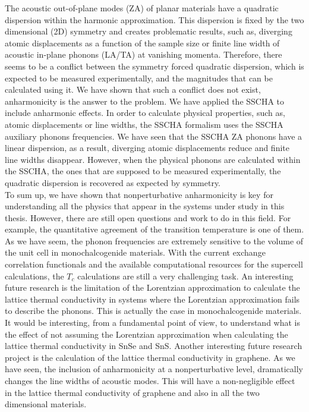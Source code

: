 The acoustic out-of-plane modes (ZA) of planar materials have a quadratic dispersion within the harmonic 
approximation. This dispersion is fixed by the two dimensional (2D) symmetry and creates problematic 
results, such as, diverging atomic displacements as a function of the sample size or finite line width of acoustic 
in-plane phonons (LA/TA) at vanishing momenta. Therefore, there seems to be a conflict between the symmetry forced 
quadratic dispersion, which is expected to be measured experimentally, and the magnitudes that can be calculated 
using it. We have shown that such a conflict does not exist, anharmonicity is the answer to the problem. We have 
applied the SSCHA to include anharmonic effects. In order to calculate physical properties, such as, atomic 
displacements or line widths, the SSCHA formalism uses the SSCHA auxiliary phonons frequencies. We have seen that 
the SSCHA ZA phonons have a linear dispersion, as a result, diverging atomic displacements reduce and finite line 
widths disappear. However, when the physical phonons are calculated within the SSCHA, the ones that are supposed to 
be measured experimentally, the quadratic dispersion is recovered as expected by symmetry. \\

To sum up, we have shown that nonperturbative anharmonicity is key for understanding all the physics that appear 
in the systems under study in this thesis. However, there are still open questions and work to do in this field. For 
example, the quantitative agreement of the transition temperature is one of them. As we have seem, the phonon 
frequencies are extremely sensitive to the volume of the unit cell in monochalcogenide materials. With the current 
exchange correlation functionals and the available computational resources for the supercell calculations, the 
$T_{c}$ calculations are still a very challenging task. An interesting future research is the limitation of the 
Lorentzian approximation to calculate the lattice thermal conductivity in systems where the Lorentzian approximation
fails to describe the phonons. This is actually the case in monochalcogenide materials. It would be interesting, from 
a fundamental point of view, to understand what is the effect of not assuming the Lorentzian approximation when 
calculating the lattice thermal conductivity in SnSe and SnS. Another interesting future research project is the 
calculation of the lattice thermal conductivity in graphene. As we have seen, the inclusion of anharmonicity at 
a nonperturbative level, dramatically changes the line widths of acoustic modes. This will have a non-negligible 
effect in the lattice thermal conductivity of graphene and also in all the two dimensional materials.
